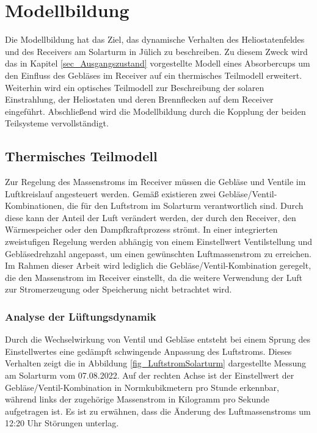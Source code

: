 \chapter{Modellbildung} \label{ch_Modellbildung}
Die Modellbildung hat das Ziel, das dynamische Verhalten des Heliostatenfeldes und des Receivers am Solarturm in Jülich zu beschreiben.
Zu diesem Zweck wird das in Kapitel \ref{sec_Ausgangszustand} vorgestellte Modell eines Absorbercups um den Einfluss des Gebläses im Receiver auf ein thermisches Teilmodell erweitert.
Weiterhin wird ein optisches Teilmodell zur Beschreibung der solaren Einstrahlung, der Heliostaten und deren Brennflecken auf dem Receiver eingeführt.
Abschließend wird die Modellbildung durch die Kopplung der beiden Teilsysteme vervollständigt.

\section{Thermisches Teilmodell} \label{sec_thermischesModell}
Zur Regelung des Massenstroms im Receiver müssen die Gebläse und Ventile im Luftkreislauf angesteuert werden.
Gemäß \cite[S.10ff]{DissGall} existieren zwei Gebläse/Ventil-Kombinationen, die für den Luftstrom im Solarturm verantwortlich sind.
Durch diese kann der Anteil der Luft verändert werden, der durch den Receiver, den Wärmespeicher oder den Dampfkraftprozess strömt.
In einer integrierten zweistufigen Regelung werden abhängig von einem Einstellwert Ventilstellung und Gebläsedrehzahl angepasst, um einen gewünschten Luftmassenstrom zu erreichen.
Im Rahmen dieser Arbeit wird lediglich die Gebläse/Ventil-Kombination geregelt, die den Massenstrom im Receiver einstellt, da die weitere Verwendung der Luft zur Stromerzeugung oder Speicherung nicht betrachtet wird.

\subsection{Analyse der Lüftungsdynamik} \label{subsec_AnalyseLüftungsDyn}
Durch die Wechselwirkung von Ventil und Gebläse entsteht bei einem Sprung des Einstellwertes eine gedämpft schwingende Anpassung des Luftstroms.
Dieses Verhalten zeigt die in Abbildung \ref{fig_LuftstromSolarturm} dargestellte Messung am Solarturm vom 07.08.2022.
Auf der rechten Achse ist der Einstellwert der Gebläse/Ventil-Kombination in Normkubikmetern pro Stunde erkennbar, während links der zugehörige Massenstrom in Kilogramm pro Sekunde aufgetragen ist.
Es ist zu erwähnen, dass die Änderung des Luftmassenstroms um 12:20 Uhr Störungen unterlag. \pagebreak

